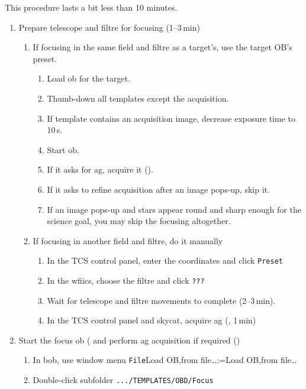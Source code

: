 \documentclass[11pt,fleqn,a4paper]{book}
\makeatletter
\def\menu#1#2{\texttt{#1}\ifx{}#2\else\@for\@x:=#2\do{$\rightarrow$\texttt{\@x}}\fi}
\def\wmenu#1#2{window menu \menu{#1}{#2}}
\makeatother
\begin{document}
\label{proc:wfifocseq}
This procedure lasts a bit less than 10 minutes.
\begin{enumerate}
    \item Prepare telescope and filtre for focusing (1--3\,min)
    \begin{enumerate}
        \item If focusing in the same field and filtre as a target's, use the target OB's preset.
        \begin{enumerate}
            \item Load \gls{ob} for the target.
            \item Thumb-down all templates except the \gls{acquisition}.
            \item If template contains an acquisition image, decrease exposure time to 10\,s.
            \item Start ob.
            \item If it asks for \acrlong{ag}, acquire it ().
            \item If it asks to refine acquisition after an image pops-up, skip it.
            \item If an image pops-up and stars appear round and sharp enough for the science goal, you may skip the focusing altogether.
        \end{enumerate}
        \item If focusing in another field and filtre, do it manually
        \begin{enumerate}
            \item In the \gls{TCS control panel}, enter the coordinates and click \texttt{Preset} 
            \item In the \gls{wfiics}, choose the filtre and click \texttt{???} 
            \item Wait for telescope and filtre movements to complete (2--3\,min).
            \item In the \gls{TCS control panel} and \gls{skycat}, acquire \acrlong{ag} (, 1\,min)
        \end{enumerate}
    \end{enumerate}
    \item Start the focus \gls{ob} ( and perform \gls{ag} \gls{acquisition} if required ()
    \begin{enumerate}
        \item In bob, use \wmenu{File}{Load OB,from file…}
        \item Double-click subfolder \texttt{.../TEMPLATES/OBD/Focus}

\end{enumerate}
\end{enumerate}
\end{document}
